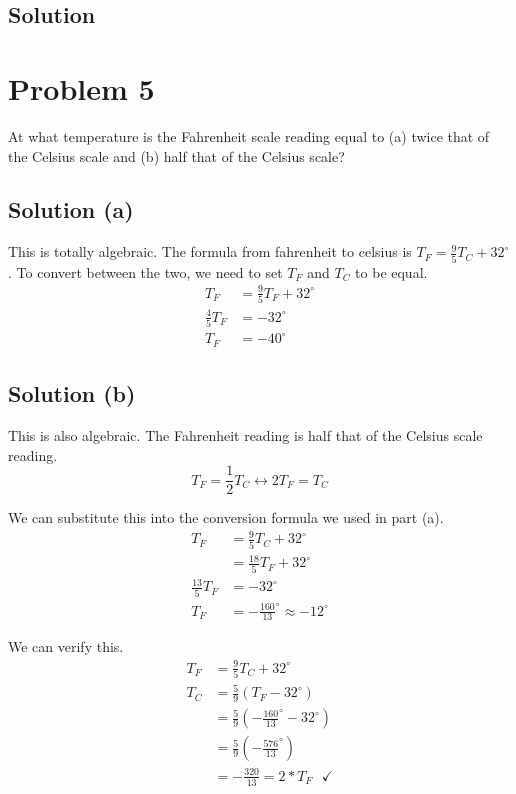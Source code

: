 \documentclass[12pt]{article}
\begin{document}
    \subsection{Solution}

    \pagebreak
    \section{Problem 5}
        At what temperature is the Fahrenheit scale reading equal to (a) twice that of the Celsius scale and (b) half that of the Celsius scale?

        \subsection{Solution (a)}
            This is totally algebraic. 
            The formula from fahrenheit to celsius is $T_F = \frac{9}{5}T_C + 32^{\circ}$.
            To convert between the two, we need to set $T_F$ and $T_C$ to be equal.
            \begin{align}
                T_F &=  \frac{9}{5}T_F + 32^\circ\\
                \frac{4}{5}T_F  &=  -32^\circ\\
                T_F &=  \boxed{-40^\circ}
            \end{align}

        \subsection{Solution (b)}
            This is also algebraic.
            The Fahrenheit reading is half that of the Celsius scale reading.
            \begin{equation}
                T_F = \frac{1}{2}T_C \leftrightarrow 2 T_F = T_C
            \end{equation}

            We can substitute this into the conversion formula we used in part (a).
            \begin{align}
                T_F &=  \frac{9}{5}T_C + 32^\circ\\
                    &=  \frac{18}{5}T_F + 32^\circ\\
                \frac{13}{5}T_F &=  -32^\circ\\
                T_F &=  \boxed{-\frac{160}{13}^\circ \approx -12^\circ}
            \end{align}

            We can verify this.
            \begin{align}
                T_F &=  \frac{9}{5}T_C + 32^\circ\\
                T_C &=  \frac{5}{9}\left(T_F - 32^\circ\right)\\
                    &=  \frac{5}{9}\left(-\frac{160}{13}^\circ - 32^\circ\right)\\
                    &=  \frac{5}{9}\left(-\frac{576}{13}^\circ\right)\\
                    &=  -\frac{320}{13} = 2 * T_F\ \ \ \checkmark
            \end{align}
\end{document}
